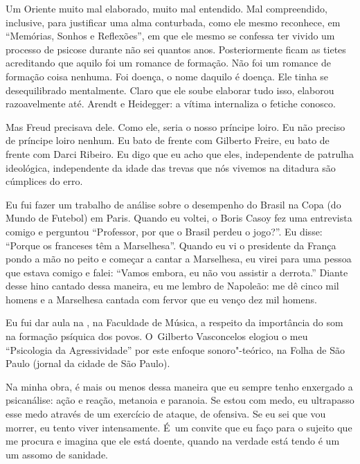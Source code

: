  

Um Oriente muito mal elaborado, muito mal entendido. Mal compreendido,
inclusive, para justificar uma alma conturbada, como ele mesmo
reconhece, em ``Memórias, Sonhos e Reflexões'', em que ele mesmo se
confessa ter vivido um processo de psicose durante não sei quantos anos.
Posteriormente ficam as tietes acreditando que aquilo foi um romance de
formação. Não foi um romance de formação coisa nenhuma. Foi doença, o
nome daquilo é doença. Ele tinha se desequilibrado mentalmente. Claro
que ele soube elaborar tudo isso, elaborou razoavelmente até. Arendt e
Heidegger: a vítima internaliza o fetiche conosco.

 

Mas Freud precisava dele. Como ele, seria o nosso príncipe loiro. Eu não
preciso de príncipe loiro nenhum. Eu bato de frente com Gilberto Freire,
eu bato de frente com Darci Ribeiro. Eu digo que eu acho 
que eles, independente de patrulha
ideológica, independente da idade das trevas que nós vivemos na ditadura
são cúmplices do erro.

 

Eu fui fazer um trabalho de análise sobre o desempenho do Brasil na Copa
(do Mundo de Futebol) em Paris. Quando eu voltei, o Boris Casoy fez uma
entrevista comigo e perguntou ``Professor, por que o Brasil perdeu o
jogo?''. Eu disse: ``Porque os franceses têm a Marselhesa''. Quando eu vi
o presidente da França pondo a mão no peito e começar a cantar a
Marselhesa, eu virei para uma pessoa que estava comigo e falei: ``Vamos
embora, eu não vou assistir a derrota.'' Diante desse hino cantado dessa
maneira, eu me lembro de Napoleão: me dê cinco mil homens e a
Marselhesa cantada com fervor que eu venço dez mil homens.

 

Eu fui dar aula na , na Faculdade de Música, a respeito da importância
do som na formação psíquica dos povos. O~Gilberto Vasconcelos elogiou o
meu ``Psicologia da Agressividade'' por este enfoque sonoro"-teórico, na
Folha de São Paulo (jornal da cidade de São Paulo).

 

Na minha obra, é mais ou menos dessa maneira que eu sempre tenho
enxergado a psicanálise: ação e reação, metanoia e paranoia. Se estou
com medo, eu ultrapasso esse medo através de um exercício de ataque, de
ofensiva. Se eu sei que vou morrer, eu tento viver intensamente. É~um
convite que eu faço para o sujeito que me procura e imagina que ele está
doente, quando na verdade está tendo é um um assomo de sanidade.

